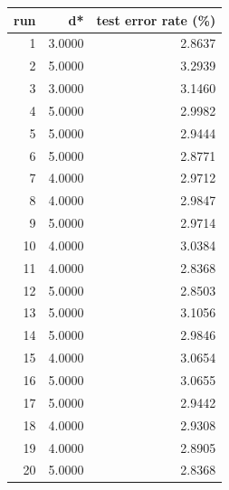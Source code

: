 \begin{tabular}{rrr}
\toprule
run & d* & test error rate (\%) \\
\midrule
1 & 3.0000 & 2.8637 \\
2 & 5.0000 & 3.2939 \\
3 & 3.0000 & 3.1460 \\
4 & 5.0000 & 2.9982 \\
5 & 5.0000 & 2.9444 \\
6 & 5.0000 & 2.8771 \\
7 & 4.0000 & 2.9712 \\
8 & 4.0000 & 2.9847 \\
9 & 5.0000 & 2.9714 \\
10 & 4.0000 & 3.0384 \\
11 & 4.0000 & 2.8368 \\
12 & 5.0000 & 2.8503 \\
13 & 5.0000 & 3.1056 \\
14 & 5.0000 & 2.9846 \\
15 & 4.0000 & 3.0654 \\
16 & 5.0000 & 3.0655 \\
17 & 5.0000 & 2.9442 \\
18 & 4.0000 & 2.9308 \\
19 & 4.0000 & 2.8905 \\
20 & 5.0000 & 2.8368 \\
\bottomrule
\end{tabular}

